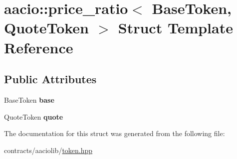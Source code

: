 \hypertarget{structaacio_1_1price__ratio}{}\section{aacio\+:\+:price\+\_\+ratio$<$ Base\+Token, Quote\+Token $>$ Struct Template Reference}
\label{structaacio_1_1price__ratio}
\subsection*{Public Attributes}
\begin{DoxyCompactItemize}
\item 
\mbox{\label{structaacio_1_1price__ratio_af7d3fd6d7df5f918df7c9fb217eb9af9}} 
Base\+Token {\bfseries base}
\item 
\mbox{\label{structaacio_1_1price__ratio_aecf446325fed4cff09a92a565026c096}} 
Quote\+Token {\bfseries quote}
\end{DoxyCompactItemize}


The documentation for this struct was generated from the following file\+:\begin{DoxyCompactItemize}
\item 
contracts/aaciolib/\mbox{\hyperlink{token_8hpp}{token.\+hpp}}\end{DoxyCompactItemize}
